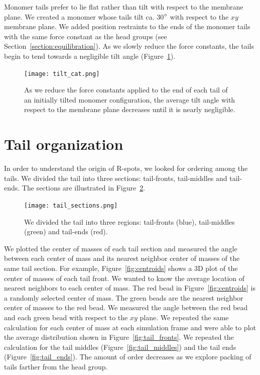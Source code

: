 \documentclass{article}
\begin{document}
  Monomer tails prefer to lie flat rather than tilt with respect to the
  membrane plane. We created a monomer whose tails tilt ca. 30$\degree$ with
  respect to the $xy$ membrane plane.  We added position restraints to the ends
  of the monomer tails with the same force constant as the head groups (see
  Section~\ref{section:equilibration}).  As we slowly reduce the force constants,
  the tails begin to tend towards a negligible tilt angle
  (Figure~\ref{fig:tail_tilt}).
  
  \begin{figure}[!htb]
  \centering
  \texttt{[image: tilt\_cat.png]}
  \caption{As we reduce the force constants applied to the end of each
  tail of an initially tilted monomer configuration, the average tilt 
  angle with respect to the membrane plane decreases until it is nearly
  negligible.}\label{fig:tail_tilt}
  \end{figure}

  \section{Tail organization}\label{section:tail_packing}
  
  In order to understand the origin of R-spots, we looked for ordering among
  the tails. We divided the tail into three sections: tail-fronts, tail-middles
  and tail-ends. The sections are illustrated in Figure~\ref{fig:tail_sections}.
  
  \begin{figure}[!htb]
  \centering
  \texttt{[image: tail\_sections.png]}
  \caption{We divided the tail into three regions: tail-fronts (blue), 
  tail-middles (green) and tail-ends (red).}\label{fig:tail_sections}
  \end{figure}
  
  We plotted the center of masses of each tail section and measured the angle 
  between each center of mass and its nearest neighbor center of masses of the
  same tail section. For example, Figure~\ref{fig:centroids} shows a 3D plot of
  the center of masses of each tail front. We wanted to know the average location
  of nearest neighbors to each center of mass. The red bead in 
  Figure~\ref{fig:centroids} is a randomly selected center of mass. The
  green beads are the nearest neighbor center of masses to the red bead. We
  measured the angle between the red bead and each green bead with respect to
  the $xy$ plane. We repeated the same calculation for each center of mass at
  each simulation frame and were able to plot the average distribution shown
  in Figure~\ref{fig:tail_fronts}. We repeated the calculation for the tail
  middles (Figure~\ref{fig:tail_middles}) and the tail ends 
  (Figure~\ref{fig:tail_ends}). The amount of order decreases as we explore
  packing of tails farther from the head group.
\end{document}
